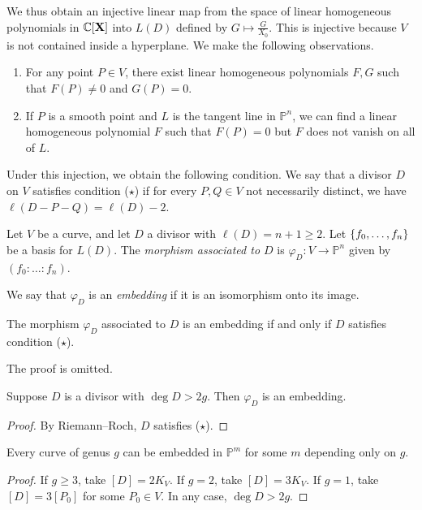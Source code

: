 We thus obtain an injective linear map from the space of linear homogeneous polynomials in \( \mathbb C[\vb X] \) into \( L(D) \) defined by \( G \mapsto \frac{G}{X_0} \).
This is injective because \( V \) is not contained inside a hyperplane.
We make the following observations.
\begin{enumerate}
    \item For any point \( P \in V \), there exist linear homogeneous polynomials \( F, G \) such that \( F(P) \neq 0 \) and \( G(P) = 0 \).
    \item If \( P \) is a smooth point and \( L \) is the tangent line in \( \mathbb P^n \), we can find a linear homogeneous polynomial \( F \) such that \( F(P) = 0 \) but \( F \) does not vanish on all of \( L \).
\end{enumerate}
Under this injection, we obtain the following condition.
We say that a divisor \( D \) on \( V \) satisfies condition (\( \star \)) if for every \( P, Q \in V \) not necessarily distinct, we have \( \ell(D - P - Q) = \ell(D) - 2 \).
\begin{definition}
    Let \( V \) be a curve, and let \( D \) a divisor with \( \ell(D) = n + 1 \geq 2 \).
    Let \( \qty{f_0, \dots, f_n} \) be a basis for \( L(D) \).
    The \emph{morphism associated to \( D \)} is \( \varphi_D \colon V \to \mathbb P^n \) given by \( (f_0 : \dots : f_n) \).
\end{definition}
We say that \( \varphi_D \) is an \emph{embedding} if it is an isomorphism onto its image.
\begin{theorem}
    The morphism \( \varphi_D \) associated to \( D \) is an embedding if and only if \( D \) satisfies condition (\( \star \)).
\end{theorem}
The proof is omitted.
\begin{corollary}
    Suppose \( D \) is a divisor with \( \deg D > 2g \).
    Then \( \varphi_D \) is an embedding.
\end{corollary}
\begin{proof}
    By Riemann--Roch, \( D \) satisfies (\( \star \)).
\end{proof}
\begin{corollary}
    Every curve of genus \( g \) can be embedded in \( \mathbb P^m \) for some \( m \) depending only on \( g \).
\end{corollary}
\begin{proof}
    If \( g \geq 3 \), take \( [D] = 2K_V \).
    If \( g = 2 \), take \( [D] = 3K_V \).
    If \( g = 1 \), take \( [D] = 3[P_0] \) for some \( P_0 \in V \).
    In any case, \( \deg D > 2g \).
\end{proof}
